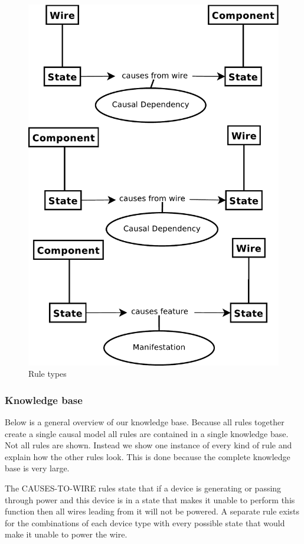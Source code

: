 \documentclass[a4paper,10pt]{article}
\begin{document}
\begin{figure}[htbp]
	\centering
		\includegraphics[width=1.00\textwidth]{rule-types.pdf}
	\caption{Rule types}
	\label{fig:IS}
\end{figure}

\subsubsection{Knowledge base}
Below is a general overview of our knowledge base. Because all rules together create a single causal model all rules are contained in a single knowledge base. Not all rules are shown. Instead we show one instance of every kind of rule and explain how the other rules look. This is done because the complete knowledge base is very large.

The CAUSES-TO-WIRE rules state that if a device is generating or passing through power and this device is in a state that makes it unable to perform this function then all wires leading from it will not be powered. A separate rule exists for the combinations of each device type with every possible state that would make it unable to power the wire.
\end{document}
